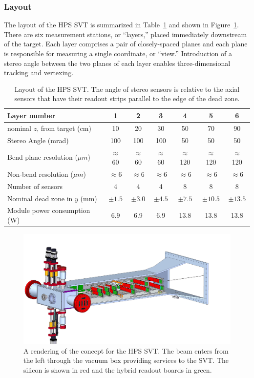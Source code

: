 \subsubsection{Layout}

The layout of the HPS SVT is summarized in Table~\ref{table:svt_layout} and shown in Figure~\ref{figure:svt_layout}. There are six measurement stations, or ``layers,'' placed immediately downstream of the target. Each layer comprises a pair of closely-spaced planes and each plane is responsible for measuring a single coordinate, or ``view.'' Introduction of a stereo angle between the two planes of each layer enables three-dimensional tracking and vertexing.
\begin{table}[h]
\begin{center}
\begin{tabular}{lcccccc}   
\hline \hline 
    Layer number & 1 & 2 & 3 & 4 & 5 & 6 \\      
\hline
    nominal $z$, from target (cm)  & 10 & 20 & 30 & 50 & 70  & 90 \\ 
    Stereo Angle (mrad)  & 100 & 100 & 100 & 50 & 50 & 50 \\ 
    Bend-plane resolution ($\mu m$)  & $\approx$60 & $\approx$60 & $\approx$60 & $\approx$120 & $\approx$120 & $\approx$120 \\ 
    Non-bend resolution ($\mu m$)  & $\approx$6 & $\approx$6 & $\approx$6 & $\approx$6 & $\approx$6  & $\approx$6 \\ 
    Number of sensors  & 4 & 4 & 4 & 8 & 8 & 8 \\ 
    Nominal dead zone in $y$ (mm)  & $\pm1.5$  & $\pm3.0$  & $\pm4.5$  & $\pm7.5$  & $\pm10.5$ & $\pm13.5$  \\ 
    Module power consumption (W) & 6.9 & 6.9 & 6.9 & 13.8 & 13.8 & 13.8 \\
\hline \hline
\end{tabular}
\caption[]{Layout of the HPS SVT.  The angle of stereo sensors is relative to the axial sensors that have their readout strips parallel to the edge of the dead zone.}
\label{table:svt_layout} 
\end{center}
\end{table}
\begin{figure}[ht]
    \includegraphics[width=\textwidth]{svt/figures/10dec6.jpg}
\caption{\small{A rendering of the concept for the HPS SVT.  The beam enters from the left through the vacuum box providing services to the SVT.  The silicon is shown in red and the hybrid readout boards in green.} }
\label{figure:svt_layout}
\end{figure}

